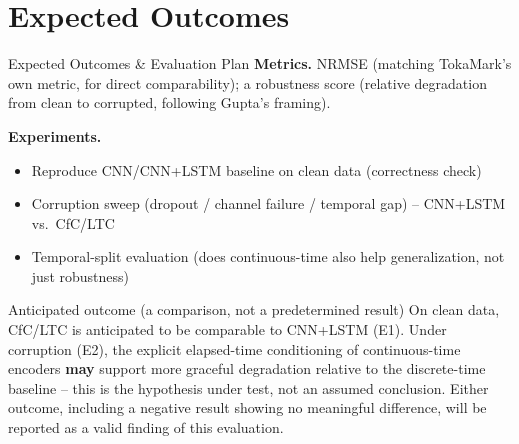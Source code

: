 \documentclass[aspectratio=169]{beamer}
\begin{document}
\section{Expected Outcomes}
\begin{frame}{Expected Outcomes \& Evaluation Plan}
  \small
  \textbf{Metrics.} NRMSE (matching TokaMark's own metric, for direct
  comparability); a robustness score (relative degradation from clean to
  corrupted, following Gupta's framing).

  \vspace{4pt}
  \textbf{Experiments.}
  \begin{itemize}
    \item[E1] Reproduce CNN/CNN+LSTM baseline on clean data (correctness check)
    \item[E2] Corruption sweep (dropout / channel failure / temporal gap) -- CNN+LSTM vs.\ CfC/LTC
    \item[E3] Temporal-split evaluation (does continuous-time also help generalization, not just robustness)
  \end{itemize}

  \vspace{4pt}
  \begin{block}{Anticipated outcome (a comparison, not a predetermined result)}
    On clean data, CfC/LTC is anticipated to be comparable to CNN+LSTM (E1).
    Under corruption (E2), the explicit elapsed-time conditioning of
    continuous-time encoders \textbf{may} support more graceful degradation
    relative to the discrete-time baseline -- this is the hypothesis under
    test, not an assumed conclusion. Either outcome, including a negative
    result showing no meaningful difference, will be reported as a valid
    finding of this evaluation.
  \end{block}
\end{frame}

\end{document}
